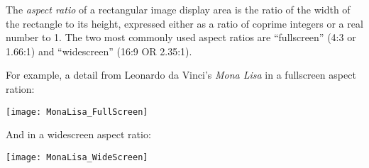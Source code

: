 \documentclass[12pt]{article}
\begin{document}
The {\em aspect ratio} of a rectangular image display area is the ratio of the width of the rectangle to its height, expressed either as a ratio of coprime integers or a real number to 1. The two most commonly used aspect ratios are ``fullscreen'' (4:3 or 1.66:1) and ``widescreen'' (16:9 OR 2.35:1).

For example, a detail from Leonardo da Vinci's {\it Mona Lisa} in a fullscreen aspect ration:

\begin{center}
\texttt{[image: MonaLisa\_FullScreen]}
\end{center}

And in a widescreen aspect ratio:

\begin{center}
\texttt{[image: MonaLisa\_WideScreen]}
\end{center}


\end{document}
